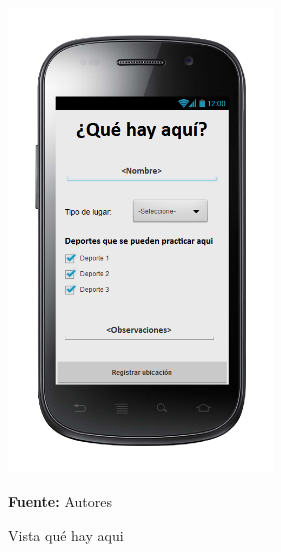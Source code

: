 \begin{figure}[!htb]
  \begin{center}
\includegraphics[width=7cm]{./imagenes/UI/Ubicacion/que_hay_aqui.png}
    \caption{Vista qué hay aqui}
    \label{fig:Vista_que_hay_aqui}
    \textbf{Fuente:}  Autores
  \end{center}
\end{figure}

